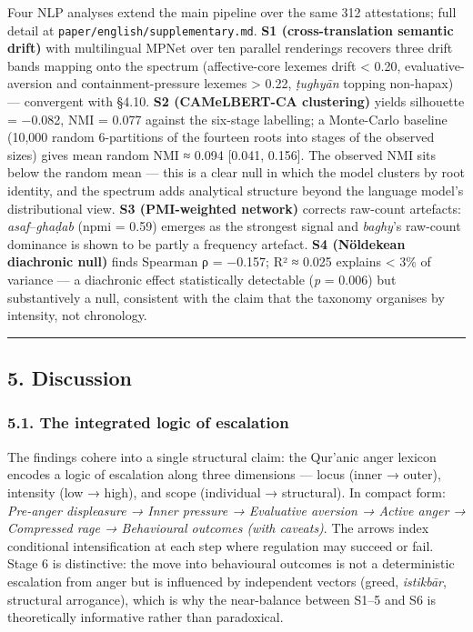 \documentclass[11pt,a4paper]{article}
\begin{document}
Four NLP analyses extend the main pipeline over the same 312
attestations; full detail at \texttt{paper/english/supplementary.md}.
\textbf{S1 (cross-translation semantic drift)} with multilingual MPNet
over ten parallel renderings recovers three drift bands mapping onto the
spectrum (affective-core lexemes drift \textless{} 0.20,
evaluative-aversion and containment-pressure lexemes \textgreater{}
0.22, \emph{ṭughyān} topping non-hapax) --- convergent with §4.10.
\textbf{S2 (CAMeLBERT-CA clustering)} yields silhouette = −0.082, NMI =
0.077 against the six-stage labelling; a Monte-Carlo baseline (10,000
random 6-partitions of the fourteen roots into stages of the observed
sizes) gives mean random NMI ≈ 0.094 {[}0.041, 0.156{]}. The observed
NMI sits below the random mean --- this is a clear null in which the
model clusters by root identity, and the spectrum adds analytical
structure beyond the language model's distributional view. \textbf{S3
(PMI-weighted network)} corrects raw-count artefacts:
\emph{asaf}--\emph{ghaḍab} (npmi = 0.59) emerges as the strongest signal
and \emph{baghy}'s raw-count dominance is shown to be partly a frequency
artefact. \textbf{S4 (Nöldekean diachronic null)} finds Spearman ρ =
−0.157; R² ≈ 0.025 explains \textless{} 3\% of variance --- a diachronic
effect statistically detectable (\emph{p} = 0.006) but substantively a
null, consistent with the claim that the taxonomy organises by
intensity, not chronology.

\begin{center}\rule{0.5\linewidth}{0.5pt}\end{center}

\subsection{5. Discussion}\label{discussion}

\subsubsection{5.1. The integrated logic of
escalation}\label{the-integrated-logic-of-escalation}

The findings cohere into a single structural claim: the Qur'anic anger
lexicon encodes a logic of escalation along three dimensions --- locus
(inner → outer), intensity (low → high), and scope (individual →
structural). In compact form: \emph{Pre-anger displeasure → Inner
pressure → Evaluative aversion → Active anger → Compressed rage →
Behavioural outcomes (with caveats)}. The arrows index conditional
intensification at each step where regulation may succeed or fail. Stage
6 is distinctive: the move into behavioural outcomes is not a
deterministic escalation from anger but is influenced by independent
vectors (greed, \emph{istikbār}, structural arrogance), which is why the
near-balance between S1--5 and S6 is theoretically informative rather
than paradoxical.
\end{document}
